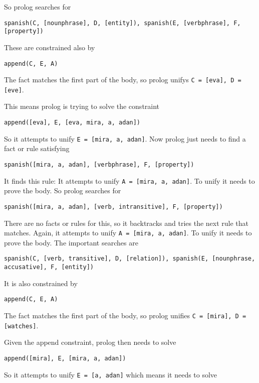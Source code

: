 \documentclass[12pt,letterpaper]{article}
\begin{document}
\begin{enumerate}
      So prolog searches for

      \texttt{spanish(C, [nounphrase], D, [entity]), spanish(E, [verbphrase], F, [property])}

      These are constrained also by

      \texttt{append(C, E, A)}

      The fact
      matches the first part of the body,
      so prolog unifys \texttt{C = [eva], D = [eve]}.

      This means prolog is trying to solve the constraint

      \texttt{append([eva], E, [eva, mira, a, adan])}

      So it attempts to unify \texttt{E = [mira, a, adan]}.
      Now prolog just needs to find a fact or rule satisfying

      \texttt{spanish([mira, a, adan], [verbphrase], F, [property])}

      It finds this rule:
      It attempts to unify \texttt{A = [mira, a, adan]}.
      To unify it needs to prove the body.
      So prolog searches for

      \texttt{spanish([mira, a, adan], [verb, intransitive], F, [property])}

      There are no facts or rules for this, so it backtracks and tries the next rule that matches.
      Again, it attempts to unify \texttt{A = [mira, a, adan]}.
      To unify it needs to prove the body.
      The important searches are

      \texttt{spanish(C, [verb, transitive], D, [relation]), spanish(E, [nounphrase, accusative], F, [entity])}

      It is also constrained by

      \texttt{append(C, E, A)}

      The fact
      matches the first part of the body,
      so prolog unifies \texttt{C = [mira], D = [watches]}.

      Given the append constraint,
      prolog then needs to solve

      \texttt{append([mira], E, [mira, a, adan])}

      So it attempts to unify \texttt{E = [a, adan]}
      which means it needs to solve


\end{enumerate}
\end{document}
